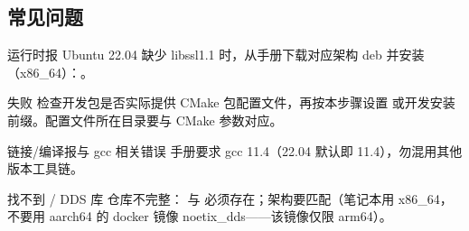 \subsection*{常见问题}
\begin{faq}{运行时报 }
Ubuntu 22.04 缺少 libssl1.1 时，从手册下载对应架构 deb 并安装（x86\_64）：。
\end{faq}
\begin{faq}{ 失败}
检查开发包是否实际提供 CMake 包配置文件，再按本步骤设置  或开发安装前缀。配置文件所在目录要与 CMake 参数对应。
\end{faq}
\begin{faq}{链接/编译报与 gcc 相关错误}
手册要求 gcc 11.4（22.04 默认即 11.4），勿混用其他版本工具链。
\end{faq}
\begin{faq}{找不到  / DDS 库}
仓库不完整： 与  必须存在；架构要匹配（笔记本用 x86\_64，不要用 aarch64 的 docker 镜像 noetix\_dds——该镜像仅限 arm64）。
\end{faq}
